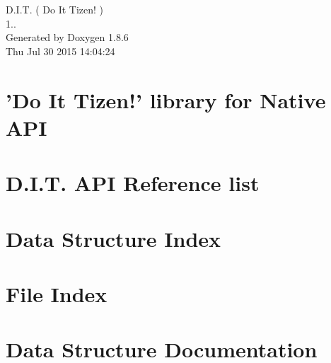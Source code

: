 \documentclass[twoside]{book}
\newcommand{\clearemptydoublepage}{%
  \newpage{\pagestyle{empty}\cleardoublepage}%
}
\begin{document}
\begin{titlepage}
\vspace*{7cm}
\begin{center}%
{\Large D.\-I.\-T. ( Do It Tizen! ) \\[1ex]\large 1.. }\\
\vspace*{1cm}
{\large Generated by Doxygen 1.8.6}\\
\vspace*{0.5cm}
{\small Thu Jul 30 2015 14:04:24}\\
\end{center}
\end{titlepage}
\clearemptydoublepage
\tableofcontents
\clearemptydoublepage
{}

\chapter{'Do It Tizen!' library for Native A\-P\-I}
\label{index}
\chapter{D.\-I.\-T. A\-P\-I Reference list}
\label{md__Users_CDJ_Dropbox_DJ_SSM_DIT_doxygen_DIT_API_Reference_list}

\chapter{Data Structure Index}

\chapter{File Index}

\chapter{Data Structure Documentation}




























\end{document}
